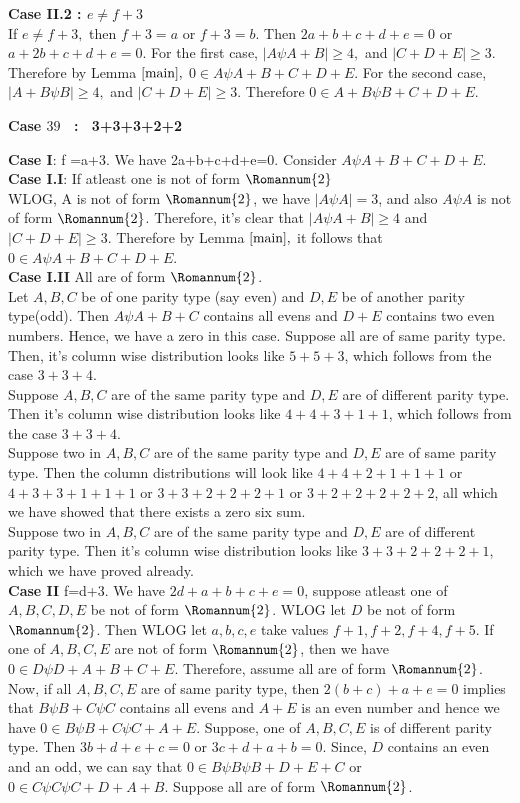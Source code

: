 \documentclass[reqno,10pt]{amsart}
\newcommand{\two}{\Romannum {2}}
\begin{document}
{\textbf{Case II.2 : $e \neq f+3$}\\
If $e\neq f+3,$  then $f+3 =a $  or $f+3=b.$ Then $2a+b+c+d+e=0$ or $a+2b+c+d+e=0.$  For the first case, $|A\psi A+B| \geq 4,$ and $|C+D+E| \geq 3.$ Therefore by Lemma $\ref{main},$ $0 \in A \psi A+B+C+D+E.$ For the second case, $|A+B\psi B| \geq 4,$
and $|C+D+E| \geq 3.$ Therefore $0 \in A+B\psi B+C+D+E.$ 
 \begin{center} 
 \textbf{Case $39$ \ : \ 3+3+3+2+2}
 \end{center}
\textbf{Case I}: f =a+3.
We have 2a+b+c+d+e=0. Consider $A \psi A+B+C+D+E$.\\
\textbf{Case I.I}: If atleast one is not of form $\two$\\ WLOG, A is not of form $\two$, we have $|A \psi A| =3 $, and also $A \psi A$ is not of form $\two$. Therefore, it's clear that $|A \psi A + B| \geq 4$ and $|C+D+E| \geq 3$. Therefore by Lemma $\ref{main},$ it follows that $0 \in A \psi A+B+C+D+E $. \\
\textbf{Case I.II} All are of form $\two$.\\
Let $A,B,C$ be of one parity type (say even) and $D,E$ be of another parity type(odd). Then $ A \psi A +B+C$ contains all evens and $D+E$ contains two even numbers. Hence, we have a zero in this case.
Suppose all are of same parity type. Then, it's column wise distribution looks like $5+5+3$, which follows from the case $3+3+4$. \\
Suppose $A,B,C$ are of the same parity type and $D,E$ are of different parity type. Then it's column wise distribution looks like $4+4+3+1+1$, which follows from the case $3+3+4$. \\
Suppose two in $A,B,C$ are of the same parity type and $D,E$ are of same parity type.  Then the column distributions will look like $4+4+2+1+1+1$ or $4+3+3+1+1+1$ or $3+3+2+2+2+1$ or $3+2+2+2+2+2$, all which we have showed that there exists a zero six sum.\\
Suppose two in $A,B,C$ are of the same parity type and $D,E$ are of different parity type. Then it's column wise distribution looks like $3+3+2+2+2+1$, which we have proved already.\\
\textbf{Case II} f=d+3. We have $2d+a+b+c+e=0$, suppose atleast one of $A,B,C,D,E$ be not of form $\two$. 
WLOG let $D$ be not of form $\two$. Then WLOG let $a,b,c,e$ take values $f+1,f+2,f+4,f+5$. If one of $A,B,C,E $ are not of form $\two$, then we have $ 0 \in D \psi D+A+B+C+E$. Therefore, assume all are of form $\two$. Now, if all $A,B,C,E$ are of same parity type, then $2(b+c)+a+e=0$ implies that $B \psi B +C \psi C $ contains all evens and $A+E$ is an even number and hence we have $ 0 \in B \psi B +C \psi C+A+E$. Suppose, one of $A,B,C,E$ is of different parity type. Then $3b+d+e+c = 0$ or $3c+d+a+b=0$. Since, $D$ contains an even and an odd, we can say that $0 \in B \psi B \psi B +D+E+C$ or $0 \in C \psi C \psi C +D+A+B$. Suppose all are of form $\two$.
}
\end{document}
